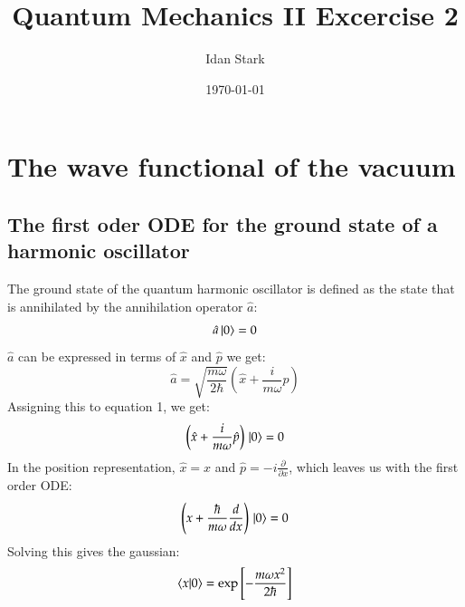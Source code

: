 \documentclass{article}
\title{Quantum Mechanics II Excercise 2}
\author{Idan Stark}
\date{\today}
\begin{document}
\maketitle

\section{The wave functional of the vacuum}
\subsection{The first oder ODE for the ground state of a harmonic oscillator}
The ground state of the quantum harmonic oscillator is defined as the state that is annihilated by the annihilation operator $\hat{a}$:
\begin{equation}
    \hat{a} \ket{0} = 0
\end{equation}
$\hat{a}$ can be expressed in terms of $\hat{x}$ and $\hat{p}$ we get:
\begin{equation}
    \hat{a} = \sqrt{\frac{m\omega}{2\hbar}}\left(\hat{x} + \frac{i}{m\omega}\hat{p}\right)
\end{equation}
Assigning this to equation 1, we get:
\begin{equation}
    \left(\hat{x} + \frac{i}{m\omega}\hat{p}\right) \\ \ket{0} = 0
\end{equation}
In the position representation, $\hat{x} = x$ and $\hat{p} = -i \frac{\partial}{\partial x}$, which leaves us with the first order ODE:
\begin{equation}
    \left(x + \frac{\hbar}{m\omega}\frac{d}{dx}\right) \\ \ket{0} = 0
\end{equation}
Solving this gives the gaussian:
\begin{equation}
    \bra{x}\ket{0} = \exp\left[-\frac{m\omega x^2}{2\hbar}\right]
\end{equation}
\end{document}
